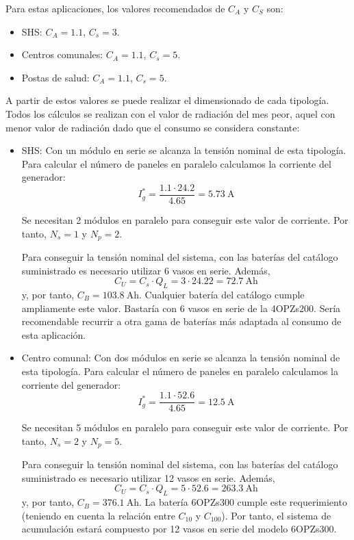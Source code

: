 Para estas aplicaciones, los valores recomendados de $C_A$ y $C_S$
son:

\begin{itemize}
\item SHS: $C_A=1.1$, $C_s=3$.
\item Centros comunales: $C_A=1.1$, $C_s=5$.
\item Postas de salud: $C_A=1.1$, $C_s=5$.
\end{itemize}

A partir de estos valores se puede realizar el dimensionado de cada
tipología. Todos los cálculos se realizan con el valor de radiación
del mes peor, aquel con menor valor de radiación dado que el consumo
se considera constante:

\begin{itemize}
\item SHS: Con un módulo en serie se alcanza la tensión nominal de
  esta tipología. Para calcular el número de paneles en paralelo
  calculamos la corriente del generador:
  \[
  I_g^* = \frac{1.1 \cdot 24.2}{4.65}=\SI{5.73}{\ampere}
  \]

  Se necesitan 2 módulos en paralelo para conseguir este valor de
  corriente. Por tanto, $N_s=1$ y $N_p=2$.

  Para conseguir la tensión nominal del sistema, con las baterías del
  catálogo suministrado es necesario utilizar 6 vasos en
  serie. Además,
  \[
  C_U=C_s \cdot Q_L = 3 \cdot 24.22 = \SI{72.7}{\ampere\hour}
  \]
  y, por tanto, $C_B= \SI{103.8}{\ampere\hour}$. Cualquier batería del
  catálogo cumple ampliamente este valor. Bastaría con 6 vasos en
  serie de la 4OPZs200. Sería recomendable recurrir a otra gama de
  baterías más adaptada al consumo de esta aplicación.

\item Centro comunal: Con dos módulos en serie se alcanza la tensión
  nominal de esta tipología. Para calcular el número de paneles en
  paralelo calculamos la corriente del generador:
  \[
  I_g^* = \frac{1.1 \cdot 52.6}{4.65}=\SI{12.5}{\ampere}
  \]

  Se necesitan 5 módulos en paralelo para conseguir este valor de
  corriente. Por tanto, $N_s=2$ y $N_p=5$.

  Para conseguir la tensión nominal del sistema, con las baterías del
  catálogo suministrado es necesario utilizar 12 vasos en
  serie. Además,
  \[
  C_U=C_s \cdot Q_L = 5 \cdot 52.6 = \SI{263.3}{\ampere\hour}
  \]
  y, por tanto, $C_B= \SI{376.1}{\ampere\hour}$. La batería 6OPZs300
  cumple este requerimiento (teniendo en cuenta la relación entre
  $C_{10}$ y $C_{100}$). Por tanto, el sistema de acumulación estará
  compuesto por 12 vasos en serie del modelo 6OPZs300.


\end{itemize}
